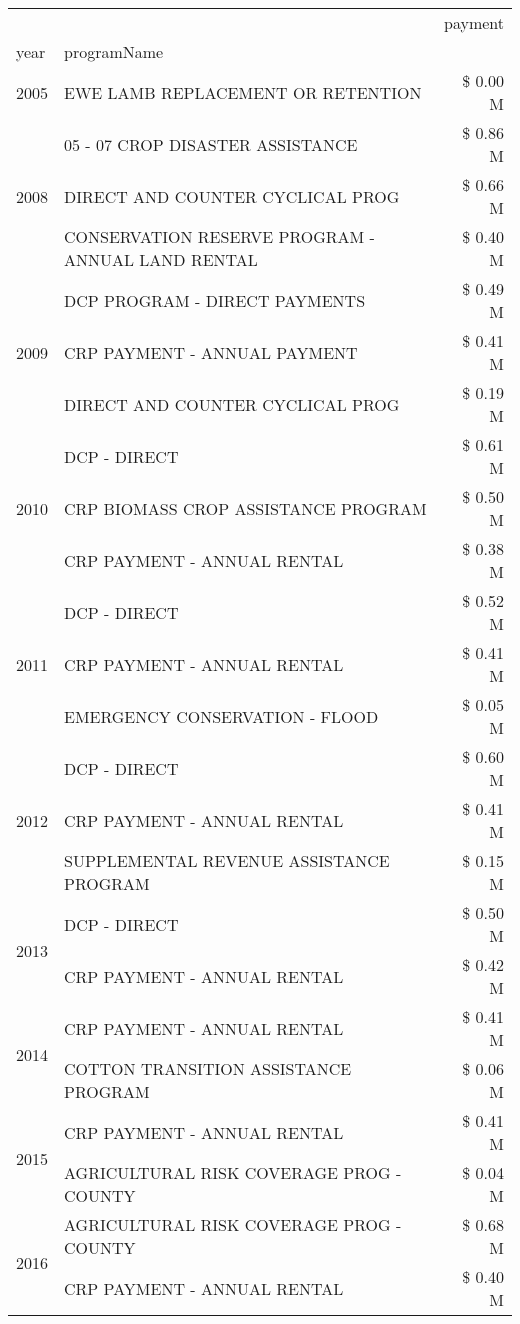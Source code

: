 \begin{tabular}{llr}
\toprule
 &  & payment \\
year & programName &  \\
\midrule
2005 & EWE LAMB REPLACEMENT OR RETENTION & \$ 0.00 M \\
\cline{1-3}
\multirow[t]{3}{*}{2008} & 05 - 07 CROP DISASTER ASSISTANCE & \$ 0.86 M \\
 & DIRECT AND COUNTER CYCLICAL PROG & \$ 0.66 M \\
 & CONSERVATION RESERVE PROGRAM - ANNUAL LAND RENTAL & \$ 0.40 M \\
\cline{1-3}
\multirow[t]{3}{*}{2009} & DCP PROGRAM - DIRECT PAYMENTS & \$ 0.49 M \\
 & CRP PAYMENT - ANNUAL PAYMENT & \$ 0.41 M \\
 & DIRECT AND COUNTER CYCLICAL PROG & \$ 0.19 M \\
\cline{1-3}
\multirow[t]{3}{*}{2010} & DCP - DIRECT & \$ 0.61 M \\
 & CRP BIOMASS CROP ASSISTANCE PROGRAM & \$ 0.50 M \\
 & CRP PAYMENT - ANNUAL RENTAL & \$ 0.38 M \\
\cline{1-3}
\multirow[t]{3}{*}{2011} & DCP - DIRECT & \$ 0.52 M \\
 & CRP PAYMENT - ANNUAL RENTAL & \$ 0.41 M \\
 & EMERGENCY CONSERVATION - FLOOD & \$ 0.05 M \\
\cline{1-3}
\multirow[t]{3}{*}{2012} & DCP - DIRECT & \$ 0.60 M \\
 & CRP PAYMENT - ANNUAL RENTAL & \$ 0.41 M \\
 & SUPPLEMENTAL REVENUE ASSISTANCE PROGRAM & \$ 0.15 M \\
\cline{1-3}
\multirow[t]{2}{*}{2013} & DCP - DIRECT & \$ 0.50 M \\
 & CRP PAYMENT - ANNUAL RENTAL & \$ 0.42 M \\
\cline{1-3}
\multirow[t]{2}{*}{2014} & CRP PAYMENT - ANNUAL RENTAL & \$ 0.41 M \\
 & COTTON TRANSITION ASSISTANCE PROGRAM & \$ 0.06 M \\
\cline{1-3}
\multirow[t]{2}{*}{2015} & CRP PAYMENT - ANNUAL RENTAL & \$ 0.41 M \\
 & AGRICULTURAL RISK COVERAGE PROG - COUNTY & \$ 0.04 M \\
\cline{1-3}
\multirow[t]{3}{*}{2016} & AGRICULTURAL RISK COVERAGE PROG - COUNTY & \$ 0.68 M \\
 & CRP PAYMENT - ANNUAL RENTAL & \$ 0.40 M \\

\end{tabular}
